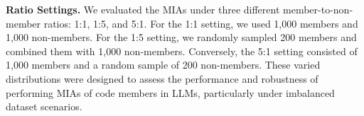 



\textbf{Ratio Settings.} We evaluated the MIAs under three different member-to-non-member ratios: 1:1, 1:5, and 5:1. For the 1:1 setting, we used 1,000 members and 1,000 non-members. For the 1:5 setting, we randomly sampled 200 members and combined them with 1,000 non-members. Conversely, the 5:1 setting consisted of 1,000 members and a random sample of 200 non-members. These varied distributions were designed to assess the performance and robustness of performing MIAs of code members in LLMs, particularly under imbalanced dataset scenarios.

 





